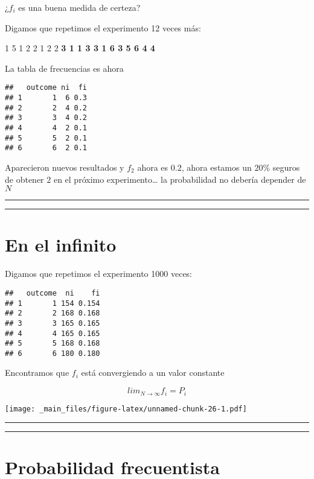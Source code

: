 \documentclass[
]{book}
\begin{document}
¿\(f_i\) es una buena medida de certeza?

Digamos que repetimos el experimento 12 veces más:

1 5 1 2 2 1 2 2 \textbf{3 1 1 3 3 1 6 3 5 6 4 4}

La tabla de frecuencias es ahora

\begin{verbatim}
##   outcome ni  fi
## 1       1  6 0.3
## 2       2  4 0.2
## 3       3  4 0.2
## 4       4  2 0.1
## 5       5  2 0.1
## 6       6  2 0.1
\end{verbatim}

Aparecieron nuevos resultados y \(f_2\) ahora es \(0.2\), ahora estamos un \(20\%\) seguros de obtener \(2\) en el próximo experimento\ldots{} la probabilidad no debería depender de \(N\)

\begin{center}\rule{0.5\linewidth}{0.5pt}\end{center}

\begin{center}\rule{0.5\linewidth}{0.5pt}\end{center}

\hypertarget{en-el-infinito}{%
\section{En el infinito}\label{en-el-infinito}}

Digamos que repetimos el experimento 1000 veces:

\begin{verbatim}
##   outcome  ni    fi
## 1       1 154 0.154
## 2       2 168 0.168
## 3       3 165 0.165
## 4       4 165 0.165
## 5       5 168 0.168
## 6       6 180 0.180
\end{verbatim}

Encontramos que \(f_i\) está convergiendo a un valor constante

\[lim_{N\rightarrow \infty} f_i = P_i\]

\texttt{[image: \_main\_files/figure-latex/unnamed-chunk-26-1.pdf]}

\begin{center}\rule{0.5\linewidth}{0.5pt}\end{center}

\begin{center}\rule{0.5\linewidth}{0.5pt}\end{center}

\hypertarget{probabilidad-frecuentista}{%
\section{Probabilidad frecuentista}\label{probabilidad-frecuentista}}
\end{document}
